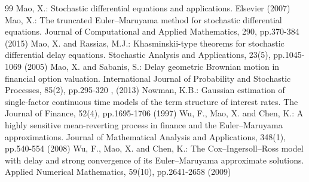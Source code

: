\documentclass[11pt]{article}
\begin{document}
\begin{thebibliography}{99}
Mao, X.: Stochastic differential equations and applications. Elsevier (2007)
Mao, X.: The truncated Euler–Maruyama method for stochastic differential equations. Journal of Computational and Applied Mathematics, 290, pp.370-384 (2015)
Mao, X. and Rassias, M.J.: Khasminskii-type theorems for stochastic differential delay equations. Stochastic Analysis and Applications, 23(5), pp.1045-1069 (2005)
Mao, X. and Sabanis, S.: Delay geometric Brownian motion in financial option valuation. International Journal of Probability and Stochastic Processes, 85(2), pp.295-320 , (2013)
Nowman, K.B.: Gaussian estimation of single-factor continuous time models of the term structure of interest rates. The Journal of Finance, 52(4), pp.1695-1706 (1997)
Wu, F., Mao, X. and Chen, K.: A highly sensitive mean-reverting process in finance and the Euler–Maruyama approximations. Journal of Mathematical Analysis and Applications, 348(1), pp.540-554 (2008)
Wu, F., Mao, X. and Chen, K.: The Cox–Ingersoll–Ross model with delay and strong convergence of its Euler–Maruyama approximate solutions. Applied Numerical Mathematics, 59(10), pp.2641-2658 (2009)
\end{thebibliography}
\end{document}
